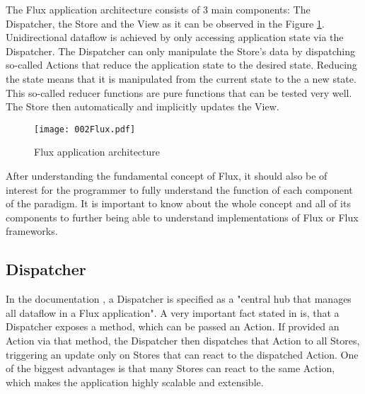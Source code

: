 
The Flux application architecture consists of 3 main components: The Dispatcher, the Store and the View as it can be observed in the Figure \ref{fig:FluxArchitecture}. Unidirectional dataflow is achieved by only accessing application state via the Dispatcher. The Dispatcher can only manipulate the Store's data by dispatching so-called Actions that reduce the application state to the desired state. Reducing the state means that it is manipulated from the current state to the a new state. This so-called reducer functions are pure functions that can be tested very well. The Store then automatically and implicitly updates the View. 


\begin{figure}
  \centering
  \texttt{[image: 002Flux.pdf]}
  \caption{Flux application architecture \cite[as in][structure-and-data-flow]{FacebookInc.2014}}
  \label{fig:FluxArchitecture}
\end{figure}

After understanding the fundamental concept of Flux, it should also be of interest for the programmer to fully understand the function of each component of the paradigm. It is important to know about the whole concept and all of its components to further being able to understand implementations of Flux or Flux frameworks.

\subsection{Dispatcher}

In the documentation \cite[a-single-dispatcher]{FacebookInc.2014}, a Dispatcher is specified as a "central hub that manages all dataflow in a Flux application". A very important fact stated in \cite[actions]{FacebookInc.2014} is, that a Dispatcher exposes a method, which can be passed an Action. If provided an Action via that method, the Dispatcher then dispatches that Action to all Stores, triggering an update only on Stores that can react to the dispatched Action. One of the biggest advantages is that many Stores can react to the same Action, which makes the application highly scalable and extensible.  

